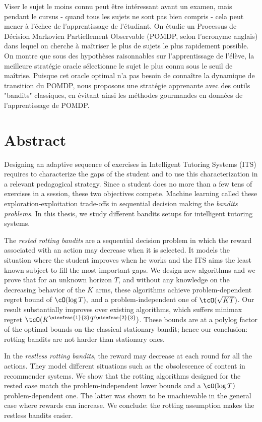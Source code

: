 Viser le sujet le moins connu peut être intéressant avant un examen, mais pendant le cursus - quand tous les sujets ne sont pas bien compris - cela peut mener à l'échec de l'apprentissage de l'étudiant. On étudie un Processus de Décision Markovien Partiellement Observable (POMDP, selon l'acronyme anglais) dans lequel on cherche à maîtriser le plus de sujets le plus rapidement possible. On montre que sous des hypothèses raisonnables sur l'apprentissage de l'élève, la meilleure stratégie oracle sélectionne le sujet le plus connu sous le seuil de maîtrise. Puisque cet oracle optimal n'a pas besoin de connaître la dynamique de transition du POMDP, nous proposons une stratégie apprenante avec des outils "bandits" classiques, en évitant ainsi les méthodes gourmandes en données de l'apprentissage de POMDP.
\newpage

\section*{Abstract}
Designing an adaptive sequence of exercises in Intelligent Tutoring Systems (ITS) requires to characterize the gaps of the student and to use this characterization in a relevant pedagogical strategy. Since a student does no more than a few tens of exercises in a session, these two objectives compete. Machine learning called these exploration-exploitation trade-offs in sequential decision making the \emph{bandits problems}. In this thesis, we study different bandits setups for intelligent tutoring systems.%

The \emph{rested rotting bandits} are a sequential decision problem in which the reward associated with an action may decrease when it is selected. It models the situation where the student improves when he works and the ITS aims the least known subject to fill the most important gaps.  We design new algorithms and we prove that for an unknown horizon $T$, and without any knowledge on the decreasing behavior of the $K$ arms, these algorithms achieve problem-dependent regret bound of $\cO(\log{T}),$ and a problem-independent one of $\tcO(\sqrt{KT})$. Our result substantially improves over existing algorithms, which suffers minimax regret $\tcO(K^{\nicefrac{1}{3}}T^{\nicefrac{2}{3}})$. These bounds are at a polylog factor of the optimal bounds on the classical stationary bandit; hence our conclusion: rotting bandits are not harder than stationary ones. 

In the \emph{restless rotting bandits}, the reward may decrease at each round for all the actions. They model different situations such as the obsolescence of content in recommender systems. We show that the rotting algorithms designed for the rested case match the problem-independent lower bounds and a $\cO(\log{T})$ problem-dependent one. The latter was shown to be unachievable in the general case where rewards can increase. We conclude: the rotting assumption makes the restless bandits easier.

